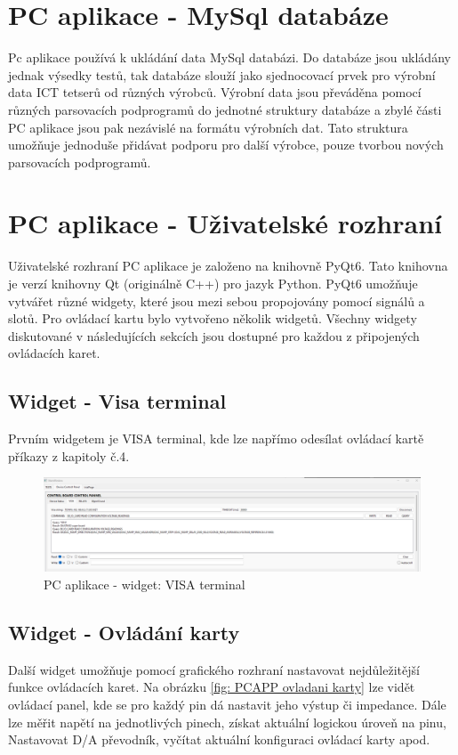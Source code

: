 \section{PC aplikace - MySql databáze}
Pc aplikace používá k ukládání data MySql databázi. Do databáze jsou ukládány jednak výsedky testů, tak databáze slouží jako sjednocovací
prvek pro výrobní data ICT tetserů od různých výrobců. 
Výrobní data jsou převáděna pomocí různých parsovacích podprogramů do jednotné struktury databáze a zbylé části PC aplikace jsou pak nezávislé na
formátu výrobních dat. Tato struktura umožňuje jednoduše přidávat podporu pro další výrobce, pouze tvorbou nových parsovacích podprogramů.

\section{PC aplikace - Uživatelské rozhraní}
Uživatelské rozhraní PC aplikace je založeno na knihovně PyQt6. Tato knihovna je verzí knihovny Qt (originálně C++) pro jazyk Python.
PyQt6 umožňuje vytvářet různé widgety, které jsou mezi sebou propojovány pomocí signálů a slotů. Pro ovládací kartu bylo vytvořeno několik
widgetů. Všechny widgety diskutované v následujících sekcích jsou dostupné pro každou z připojených ovládacích karet.

\subsection{Widget - Visa terminal}
Prvním widgetem je VISA terminal, kde lze napřímo odesílat ovládací kartě příkazy z kapitoly č.4.

\begin{figure}[ht!]
    \centering
    \includegraphics[width = 1\textwidth]{obrazky/PC_APP_VISA.png}
    \caption{PC aplikace - widget: VISA terminal}
    \label{fig: PCAPP VISA terminal}
\end{figure}

\subsection{Widget - Ovládání karty}
Další widget umožňuje pomocí grafického rozhraní nastavovat nejdůležitější funkce ovládacích karet. Na obrázku \ref{fig: PCAPP ovladani karty} lze vidět
ovládací panel, kde se pro každý pin dá nastavit jeho výstup či impedance.
Dále lze měřit napětí na jednotlivých pinech, získat aktuální logickou úroveň na pinu, Nastavovat D/A převodník, vyčítat aktuální konfiguraci ovládací karty apod.

